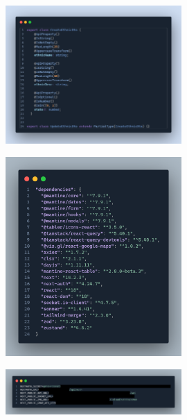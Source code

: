 \label{apendix:dto-api}
\begin{figure}[H]
    \centering
    \includegraphics[width=0.6\textwidth]{chapters/appendices/code/dto-api.png}
\end{figure}


\label{apendix:dependencias-web}
\begin{figure}[H]
    \centering
    \includegraphics[width=0.6\textwidth]{chapters/appendices/code/dependencias-web.png}
\end{figure}


\label{apendix:configuracion-env-web}
\begin{figure}[H]
    \centering
    \includegraphics[width=0.6\textwidth]{chapters/appendices/code/configuracion-env-web.png}
\end{figure}


